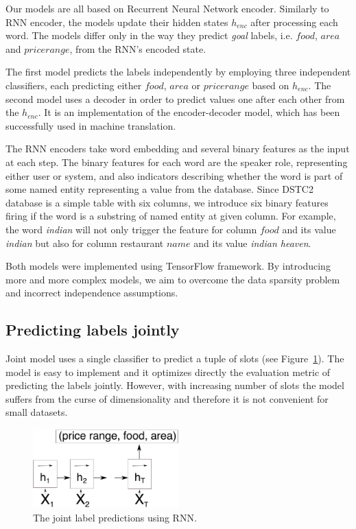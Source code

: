\documentclass{itatnew}
\begin{document}
Our models are all based on Recurrent Neural Network encoder\cite{werbos1990backpropagation}. Similarly to RNN encoder\cite{zilka2015incremental}, the models update their hidden states $h_{enc}$ after processing each word.
The models differ only in the way they predict {\it goal} labels, i.e. $food$, $area$ and $price range$, from the RNN's encoded state.

The first model predicts the labels independently by employing three independent classifiers, each predicting either $food$, $area$ or $price range$ based on $h_{enc}$.
The second model uses a decoder in order to predict values one after each other from the $h_{enc}$. It is an implementation of the encoder-decoder model, which has been successfully used in machine translation\cite{bahdanau2014neural}.

The RNN encoders take word embedding and several binary features as the input at each step.
The binary features for each word are the speaker role, representing either user or system, and also indicators describing whether the word is part of some named entity representing a value from the database.
Since DSTC2 database is a simple table with six columns, we introduce six binary features firing if the word is a substring of named entity at given column.
For example, the word {\it indian} will not only trigger the feature for column $food$ and its value {\it indian} but also for column restaurant $name$ and its value {\it indian heaven}.

Both models were implemented using TensorFlow\cite{abaditensorflow} framework. By introducing more and more complex models, we aim to overcome the data sparsity problem and incorrect independence assumptions.

\subsection{Predicting labels jointly}
\label{sec:joint}
Joint model uses a single classifier to predict a tuple of slots (see Figure~\ref{fig:encjoint}).
The model is easy to implement and it optimizes directly the evaluation metric of predicting the labels jointly.
However, with increasing number of slots the model suffers from the curse of dimensionality and therefore it is not convenient for small datasets.
\begin{figure}
\includegraphics[width=0.5\textwidth]{encoder_joint}
\caption{The joint label predictions using RNN.}
\label{fig:encjoint}
\end{figure}
\end{document}
